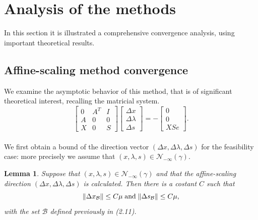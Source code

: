 \documentclass[a4paper,10 pt,titlepage,twoside]{book}
\theoremstyle{plain}
\newtheorem{lem}[thm]{Lemma}
\theoremstyle{definition}
\theoremstyle{remark}
\begin{document}
\section{Analysis of the methods}
In this section it is illustrated a comprehensive convergence analysis, using important theoretical results.

\subsection{Affine-scaling method convergence}
We examine the asymptotic behavior of this method, that is of significant theoretical interest, recalling the matricial system.\\
\begin{equation}\label{(Q)}
\begin{bmatrix}
0&A^{T}&I \\A&0&0\\X&0&S
\end{bmatrix}\begin{bmatrix}
\Delta x\\\Delta\lambda \\\Delta s
\end{bmatrix}=-\begin{bmatrix}
0\\0\\XSe
\end{bmatrix}.
\end{equation}\\	
 We first obtain a bound of the direction vector $(\Delta x,\Delta \lambda, \Delta s)$ for the feasibility case: more precisely we assume that $(x, \lambda, s)\in\mathcal{N}_{- \infty}(\gamma)$.
\begin{lem}
Suppose that $(x, \lambda, s)\in\mathcal{N}_{- \infty}(\gamma)$ and that the affine-scaling direction $(\Delta x,\Delta \lambda, \Delta s)$ is calculated. Then there is a costant $C$ such that
\begin{equation*}
	\lVert \Delta x_{\mathcal{B}} \rVert \leq C \mu \text{\;and\;} \lVert \Delta s_\mathcal{B} \rVert \leq C \mu,
\end{equation*}
with the set $\mathcal{B}$ defined previously in (2.11). 
\end{lem}
\end{document}

